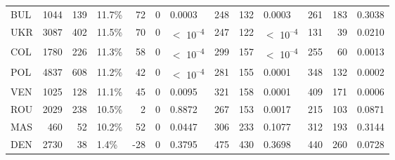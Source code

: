 \begin{tabular}[t]{lrrlrrlrrlrrl}
BUL & 1044 & 139 & 11.7\% & 72 & 0 & 0.0003 & 248 & 132 & 0.0003 & 261 & 183 & 0.3038\\
UKR & 3087 & 402 & 11.5\% & 70 & 0 & $<$ 10\textsuperscript{--4} & 247 & 122 & $<$ 10\textsuperscript{--4} & 131 & 39 & 0.0210\\
COL & 1780 & 226 & 11.3\% & 58 & 0 & $<$ 10\textsuperscript{--4} & 299 & 157 & $<$ 10\textsuperscript{--4} & 255 & 60 & 0.0013\\
POL & 4837 & 608 & 11.2\% & 42 & 0 & $<$ 10\textsuperscript{--4} & 281 & 155 & 0.0001 & 348 & 132 & 0.0002\\
VEN & 1025 & 128 & 11.1\% & 45 & 0 & 0.0095 & 321 & 158 & 0.0001 & 409 & 171 & 0.0006\\
ROU & 2029 & 238 & 10.5\% & 2 & 0 & 0.8872 & 267 & 153 & 0.0017 & 215 & 103 & 0.0871\\
MAS & 460 & 52 & 10.2\% & 52 & 0 & 0.0447 & 306 & 233 & 0.1077 & 312 & 193 & 0.3144\\
DEN & 2730 & 38 & 1.4\% & -28 & 0 & 0.3795 & 475 & 430 & 0.3698 & 440 & 260 & 0.0728\\
\bottomrule
\end{tabular}
